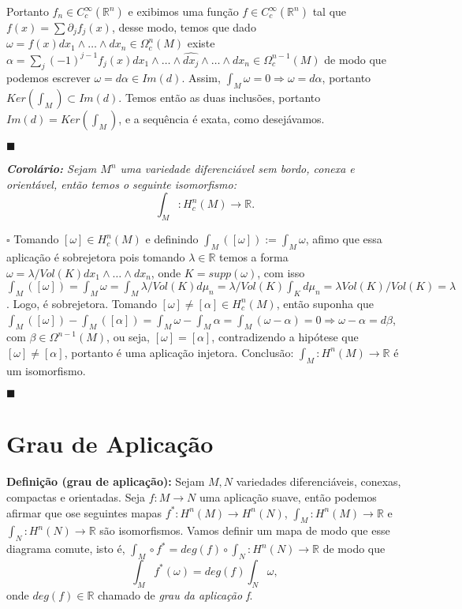 \documentclass{article}
\begin{document}
	Portanto $f_{n} \in C_{c}^{\infty}(\mathbb{R}^{n})$ e exibimos uma função $f \in C_{c}^{\infty}(\mathbb{R}^{n})$ tal que $f(x) = \sum \partial_{j}f_{j}(x)$, desse modo, temos que dado $\omega = f(x) dx_{1} \wedge \dots \wedge dx_{n} \in \Omega_{c}^{n}(M)$ existe $\alpha = \sum_{j} (-1)^{j-1}f_{j}(x) dx_{1} \wedge \dots \wedge \hat{dx_{j}} \wedge \dots \wedge dx_{n} \in \Omega_{c}^{n-1}(M)$ de modo que podemos escrever $\omega = d\alpha \in Im(d)$. Assim, $\int_{M} \omega = 0 \Rightarrow \omega = d\alpha$, portanto $Ker(\int_{M}) \subset Im(d)$. Temos então as duas inclusões, portanto $Im(d) = Ker(\int_{M})$, e a sequência é exata, como desejávamos. 
	
	$\blacksquare$
	
	\vspace{2mm}
	\textit{\textbf{Corolário:} Sejam $M^{n}$ uma variedade diferenciável sem bordo, conexa e orientável, então temos o seguinte isomorfismo:}
	$$
	\int_{M} : H^{n}_{c}(M) \to \mathbb{R}.
	$$
	
	$\square$ Tomando $[\omega] \in H^{n}_{c}(M)$ e definindo $\int_{M} ([\omega]) := \int_{M} \omega$, afimo que essa aplicação é sobrejetora pois tomando $\lambda \in \mathbb{R}$ temos a forma $\omega = \lambda/Vol(K) dx_{1} \wedge \dots \wedge dx_{n}$, onde $K = supp(\omega)$, com isso $\int_{M} ([\omega]) = \int_{M} \omega = \int_{M} \lambda/Vol(K)d\mu_{n} = \lambda/Vol(K)\int_{K} d\mu_{n} = \lambda Vol(K)/Vol(K) = \lambda$. Logo, é sobrejetora. Tomando $[\omega] \neq [\alpha] \in H^{n}_{c}(M)$, então suponha que $\int_{M} ([\omega]) - \int_{M}([\alpha])  = \int_{M} \omega - \int_{M} \alpha = \int_{M} (\omega - \alpha)= 0 \Rightarrow \omega - \alpha = d\beta$, com $\beta \in \Omega^{n-1}(M)$, ou seja, $[\omega] = [\alpha]$, contradizendo a hipótese que $[\omega] \neq [\alpha]$, portanto é uma aplicação injetora. Conclusão: $\int_{M} : H^{n}(M) \to \mathbb{R}$ é um isomorfismo. 
	
	$\blacksquare$
	
	\section{Grau de Aplicação}
	
	\textbf{Definição (grau de aplicação):} Sejam $M,N$ variedades diferenciáveis, conexas, compactas e orientadas. Seja $f: M \to N$ uma aplicação suave, então podemos afirmar que ose seguintes mapas $f^{*}: H^{n}(M) \to H^{n}(N)$, $\int_{M}: H^{n}(M) \to \mathbb{R}$ e $\int_{N}: H^{n}(N) \to \mathbb{R}$ são isomorfismos. Vamos definir um mapa de modo que esse diagrama comute, isto é, $\int_{M} \circ f^{*} = deg(f) \circ \int_{N} :  H^{n}(N) \to \mathbb{R}$ de modo que
	$$
	\int_{M} f^{*}(\omega) = deg(f) \int_{N} \omega,
	$$
	onde $deg(f) \in \mathbb{R}$ chamado de \textit{grau da aplicação f}.
	
\end{document}
